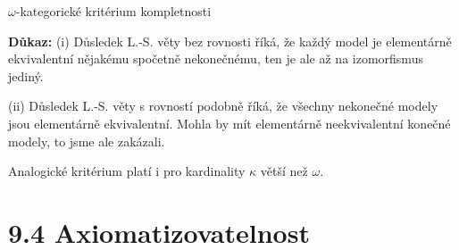 \documentclass{beamer}
\begin{document}
\begin{frame}{$\omega$-kategorické kritérium kompletnosti}



    \textbf{Důkaz:}
    \alert{(i)} Důsledek L.-S. věty bez rovnosti říká, že každý model je elementárně ekvivalentní nějakému spočetně nekonečnému, ten je ale až na izomorfismus jediný.
    
    \alert{(ii)} Důsledek L.-S. věty s rovností podobně říká, že všechny nekonečné modely jsou elementárně ekvivalentní. Mohla by mít elementárně neekvivalentní konečné modely, to jsme ale zakázali. \hfill\qedsymbol

    \medskip


    Analogické kritérium platí i pro kardinality $\kappa$ větší než $\omega$.

\end{frame}


\section{9.4 Axiomatizovatelnost}
\end{document}
